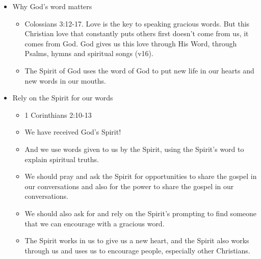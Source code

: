 \begin{itemize}
{\begin{itemize}
  \end{itemize}}
  \item{Why God's word matters
  \begin{itemize}
    \item{Colossians 3:12-17. Love is the key to speaking gracious words. But this Christian love that constantly puts others first doesn’t come from us, it comes from God. God gives us this love through His Word, through Psalms, hymns and spiritual songs (v16). }
    \item{The Spirit of God uses the word of God to put new life in our hearts and new words in our mouths.}
  \end{itemize}}
  \item{Rely on the Spirit for our words
  \begin{itemize}
    \item{1 Corinthians 2:10-13}
    \item{We have received God’s Spirit!}
    \item{And we use words given to us by the Spirit, using the Spirit’s word to explain spiritual truths.}
    \item{We should pray and ask the Spirit for opportunities to share the gospel in our conversations and also for the power to share the gospel in our conversations. }
    \item{We should also ask for and rely on the Spirit’s prompting to find someone that we can encourage with a gracious word.}
    \item{The Spirit works in us to give us a new heart, and the Spirit also works through us and uses us to encourage people, especially other Christians.}
  \end{itemize}}
\end{itemize}